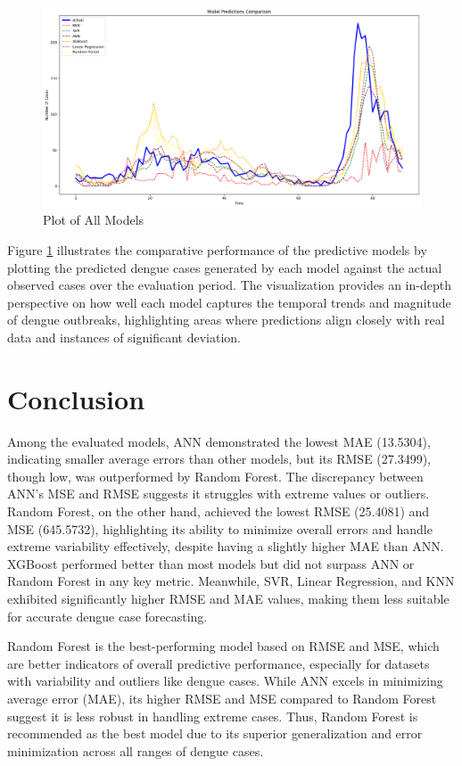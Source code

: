 \documentclass[runningheads]{llncs}
\begin{document}
\begin{figure}[h!]
    \centering
    \includegraphics[width=1\linewidth]{image/All model plot.png}
    \caption{Plot of All Models}
    \label{fig:all}
\end{figure}

Figure \ref{fig:all} illustrates the comparative performance of the predictive models by plotting the predicted dengue cases generated by each model against the actual observed cases over the evaluation period. The visualization provides an in-depth perspective on how well each model captures the temporal trends and magnitude of dengue outbreaks, highlighting areas where predictions align closely with real data and instances of significant deviation.

\section{Conclusion}
Among the evaluated models, ANN demonstrated the lowest MAE (13.5304), indicating smaller average errors than other models, but its RMSE (27.3499), though low, was outperformed by Random Forest. The discrepancy between ANN's MSE and RMSE suggests it struggles with extreme values or outliers. Random Forest, on the other hand, achieved the lowest RMSE (25.4081) and MSE (645.5732), highlighting its ability to minimize overall errors and handle extreme variability effectively, despite having a slightly higher MAE than ANN. XGBoost performed better than most models but did not surpass ANN or Random Forest in any key metric. Meanwhile, SVR, Linear Regression, and KNN exhibited significantly higher RMSE and MAE values, making them less suitable for accurate dengue case forecasting.

Random Forest is the best-performing model based on RMSE and MSE, which are better indicators of overall predictive performance, especially for datasets with variability and outliers like dengue cases.
While ANN excels in minimizing average error (MAE), its higher RMSE and MSE compared to Random Forest suggest it is less robust in handling extreme cases.
Thus, Random Forest is recommended as the best model due to its superior generalization and error minimization across all ranges of dengue cases.

\end{document}
